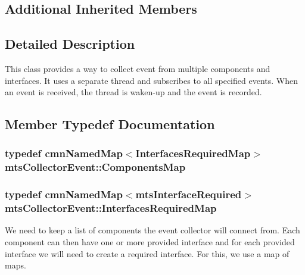 \subsection*{Additional Inherited Members}


\subsection{Detailed Description}
This class provides a way to collect event from multiple components and interfaces. It uses a separate thread and subscribes to all specified events. When an event is received, the thread is waken-\/up and the event is recorded. 

\subsection{Member Typedef Documentation}
\hypertarget{classmts_collector_event_a06ae73259368d52dfbde74f94a3b1dfb}{
\subsubsection[{Components\-Map}]{\setlength{\rightskip}{0pt plus 5cm}typedef {\bf cmn\-Named\-Map}$<${\bf Interfaces\-Required\-Map}$>$ {\bf mts\-Collector\-Event\-::\-Components\-Map}\hspace{0.3cm}{\ttfamily [protected]}}}\label{classmts_collector_event_a06ae73259368d52dfbde74f94a3b1dfb}
\hypertarget{classmts_collector_event_ac8f5ef3f2d36cef5c1dc78cb35fc79bd}{
\subsubsection[{Interfaces\-Required\-Map}]{\setlength{\rightskip}{0pt plus 5cm}typedef {\bf cmn\-Named\-Map}$<${\bf mts\-Interface\-Required}$>$ {\bf mts\-Collector\-Event\-::\-Interfaces\-Required\-Map}\hspace{0.3cm}{\ttfamily [protected]}}}\label{classmts_collector_event_ac8f5ef3f2d36cef5c1dc78cb35fc79bd}
We need to keep a list of components the event collector will connect from. Each component can then have one or more provided interface and for each provided interface we will need to create a required interface. For this, we use a map of maps. 

